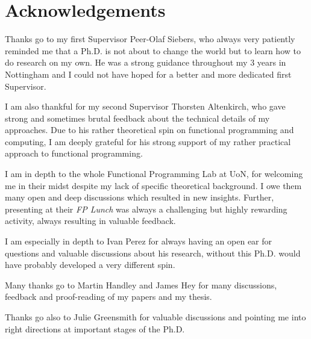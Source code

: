 \chapter*{Acknowledgements}
Thanks go to my first Supervisor Peer-Olaf Siebers, who always very patiently reminded me that a Ph.D. is not about to change the world but to learn how to do research on my own. He was a strong guidance throughout my 3 years in Nottingham and I could not have hoped for a better and more dedicated first Supervisor.

I am also thankful for my second Supervisor Thorsten Altenkirch, who gave strong and sometimes brutal feedback about the technical details of my approaches. Due to his rather theoretical spin on functional programming and computing, I am deeply grateful for his strong support of my rather practical approach to functional programming.

I am in depth to the whole Functional Programming Lab at UoN, for welcoming me in their midst despite my lack of specific theoretical background. I owe them many open and deep discussions which resulted in new insights. Further, presenting at their \textit{FP Lunch} was always a challenging but highly rewarding activity, always resulting in valuable feedback.

I am especially in depth to Ivan Perez for always having an open ear for questions and valuable discussions about his research, without this Ph.D. would have probably developed a very different spin.

Many thanks go to Martin Handley and James Hey for many discussions, feedback and proof-reading of my papers and my thesis.

Thanks go also to Julie Greensmith for valuable discussions and pointing me into right directions at important stages of the Ph.D.